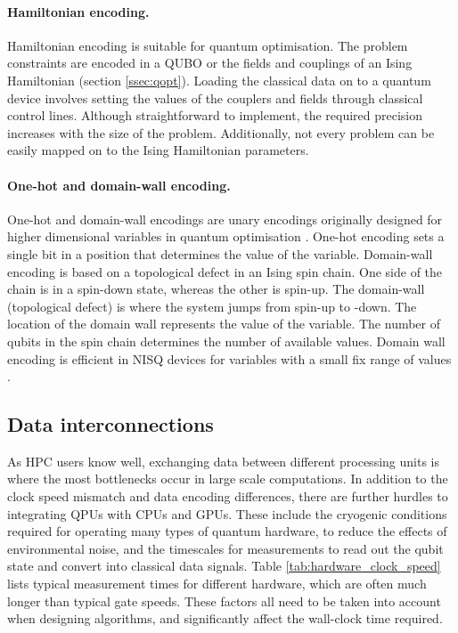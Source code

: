 \documentclass[10pt]{iopart}
\begin{document}
\paragraph{Hamiltonian encoding.}  Hamiltonian encoding is suitable for quantum optimisation.  The problem constraints are encoded in a QUBO or the fields and couplings of an Ising Hamiltonian (section \ref{ssec:qopt}). Loading the classical data on to a quantum device involves setting the values of the couplers and fields through classical control lines. Although straightforward to implement, the required precision increases with the size of the problem. Additionally, not every problem can be easily mapped on to the Ising Hamiltonian parameters. 


\paragraph{One-hot and domain-wall encoding. } One-hot and domain-wall encodings are unary encodings originally designed for higher dimensional variables in quantum optimisation \cite{Chancellor2019,Berwald2023}. 
One-hot encoding sets a single bit in a position that determines the value of the variable.
Domain-wall encoding is based on a topological defect in an Ising spin chain. One side of the chain is in a spin-down state, whereas the other is spin-up. The domain-wall (topological defect) is where the system jumps from spin-up to -down.  The location of the domain wall represents the value of the variable.  The number of qubits in the spin chain determines the number of available values.  Domain wall encoding is efficient in NISQ devices for variables with a small fix range of values \cite{Plewa2021}.

\subsection{Data interconnections}



As HPC users know well, exchanging data between different processing units is where the most bottlenecks occur in large scale computations. 
In addition to the clock speed mismatch and data encoding differences, there are further hurdles to integrating QPUs with CPUs and GPUs. These include the cryogenic conditions required for operating many types of quantum hardware, to reduce the effects of environmental noise, and the timescales for measurements to read out the qubit state and convert into classical data signals.  Table \ref{tab:hardware_clock_speed} lists typical measurement times for different hardware, which are often much longer than typical gate speeds.
These factors all need to be taken into account when designing algorithms, and significantly affect the wall-clock time required.
\end{document}
